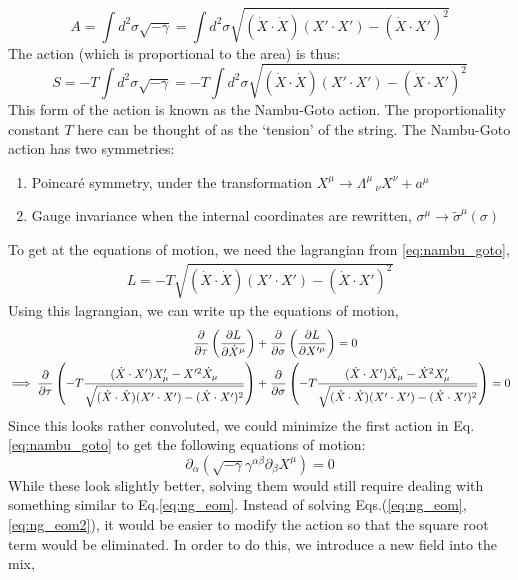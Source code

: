 \documentclass{article}
\providecommand{\brak}[1]{\ensuremath{\left(#1\right)}} %
\begin{document}
\begin{equation}
	A = \int d^2\sigma \sqrt{-\gamma} = \int d^2\sigma \sqrt{(\dot{X}\cdot\dot{X})(X'\cdot X') - (\dot{X}\cdot X')^2
}
\end{equation}
The action (which is proportional to the area) is thus:
\begin{equation}
	S = -T\int d^2\sigma \sqrt{-\gamma} = -T\int d^2\sigma \sqrt{(\dot{X}\cdot\dot{X})(X'\cdot X') - (\dot{X}\cdot X')^2}\label{eq:nambu_goto}
\end{equation}
This form of the action is known as the Nambu-Goto action. The proportionality constant $T$ here can be thought of as the `tension' of the string. The Nambu-Goto action has two symmetries:
\begin{enumerate}
	\item Poincar\'e symmetry, under the transformation $X^\mu \rightarrow \Lambda^\mu\,_\nu X^\nu + a^\mu$
	\item Gauge invariance when the internal coordinates are rewritten, $\sigma^\mu \rightarrow \tilde{\sigma}^\mu(\sigma)$
\end{enumerate}
To get at the equations of motion, we need the lagrangian from \eqref{eq:nambu_goto},
\begin{align}
	L = -T\sqrt{(\dot{X}\cdot\dot{X})(X'\cdot X') - (\dot{X}\cdot X')^2}
\end{align}
Using this lagrangian, we can write up the equations of motion,
\begin{align}
	\pdv{}{\tau}\brak{\pdv{L}{\dot{X}^\mu}}&+\pdv{}{\sigma}\brak{\pdv{L}{X'^\mu}}=0\\
	\implies \pdv{}{\tau}\brak{-T\frac{(\dot{X}\cdot X')X'_\mu-X'^2\dot{X}_\mu}{\sqrt{(\dot{X}\cdot\dot{X})(X'\cdot X') - (\dot{X}\cdot X')^2}}}&+\pdv{}{\sigma}\brak{-T\frac{(\dot{X}\cdot X')\dot{X}_\mu-\dot{X}^2X'_\mu}{\sqrt{(\dot{X}\cdot\dot{X})(X'\cdot X') - (\dot{X}\cdot X')^2}}} =0 \label{eq:ng_eom}
\end{align}
Since this looks rather convoluted, we could minimize the first action in Eq.\eqref{eq:nambu_goto} to get the following equations of motion:
\begin{equation}
	\partial_\alpha\brak{\sqrt{-\gamma}\gamma^{\alpha\beta}\partial_\beta X^\mu} =0\label{eq:ng_eom2}
\end{equation}
While these look slightly better, solving them would still require dealing with something similar to Eq.\eqref{eq:ng_eom}. Instead of solving Eqs.(\ref{eq:ng_eom},\ref{eq:ng_eom2}), it would be easier to modify the action so that the square root term would be eliminated. In order to do this, we introduce a new field into the mix,
\end{document}
